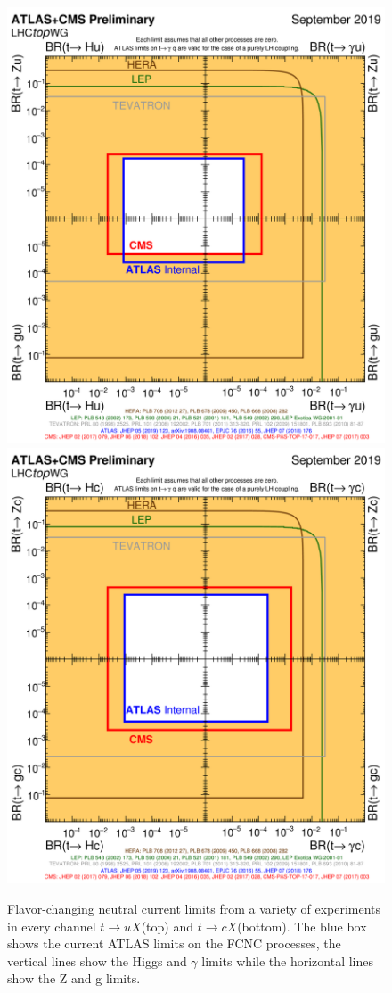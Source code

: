 \begin{figure}[h!]
	\centering
	\includegraphics[width=.5\columnwidth]{../ThesisImages/Theory/fcnc_tXu_sep18.png}
	\includegraphics[width=.5\columnwidth]{../ThesisImages/Theory/fcnc_tXc_sep18.png}
	\caption[Flavor-changing neutral current limits from a variety of experiments in every channel $t\rightarrow uX$(top) and $t\rightarrow cX$(bottom).]{Flavor-changing neutral current limits from a variety of experiments in every channel $t\rightarrow uX$(top) and $t\rightarrow cX$(bottom)\cite{TopWG}.  The blue box shows the current ATLAS limits on the FCNC processes, the vertical lines show the Higgs and $\gamma$ limits while the horizontal lines show the Z and g limits.}
	\label{fig:FCNCLimsBox}
\end{figure}


